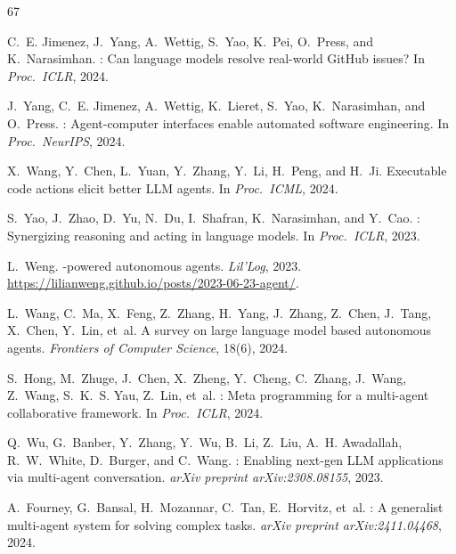 \documentclass[11pt,a4paper]{article}
\begin{document}
\begin{thebibliography}{67}

C.~E. Jimenez, J.~Yang, A.~Wettig, S.~Yao, K.~Pei, O.~Press, and K.~Narasimhan.
: Can language models resolve real-world {GitHub} issues?
\newblock In \emph{Proc.\ ICLR}, 2024.

J.~Yang, C.~E. Jimenez, A.~Wettig, K.~Lieret, S.~Yao, K.~Narasimhan, and O.~Press.
: Agent-computer interfaces enable automated software engineering.
\newblock In \emph{Proc.\ NeurIPS}, 2024.

X.~Wang, Y.~Chen, L.~Yuan, Y.~Zhang, Y.~Li, H.~Peng, and H.~Ji.
\newblock Executable code actions elicit better {LLM} agents.
\newblock In \emph{Proc.\ ICML}, 2024.

S.~Yao, J.~Zhao, D.~Yu, N.~Du, I.~Shafran, K.~Narasimhan, and Y.~Cao.
: Synergizing reasoning and acting in language models.
\newblock In \emph{Proc.\ ICLR}, 2023.

L.~Weng.
-powered autonomous agents.
\newblock \emph{Lil'Log}, 2023.
\newblock \url{https://lilianweng.github.io/posts/2023-06-23-agent/}.

L.~Wang, C.~Ma, X.~Feng, Z.~Zhang, H.~Yang, J.~Zhang, Z.~Chen, J.~Tang, X.~Chen, Y.~Lin, et~al.
\newblock A survey on large language model based autonomous agents.
\newblock \emph{Frontiers of Computer Science}, 18(6), 2024.

S.~Hong, M.~Zhuge, J.~Chen, X.~Zheng, Y.~Cheng, C.~Zhang, J.~Wang, Z.~Wang, S.~K.~S. Yau, Z.~Lin, et~al.
: Meta programming for a multi-agent collaborative framework.
\newblock In \emph{Proc.\ ICLR}, 2024.

Q.~Wu, G.~Banber, Y.~Zhang, Y.~Wu, B.~Li, Z.~Liu, A.~H. Awadallah, R.~W.~White, D.~Burger, and C.~Wang.
: Enabling next-gen {LLM} applications via multi-agent conversation.
\newblock \emph{arXiv preprint arXiv:2308.08155}, 2023.

A.~Fourney, G.~Bansal, H.~Mozannar, C.~Tan, E.~Horvitz, et~al.
: A generalist multi-agent system for solving complex tasks.
\newblock \emph{arXiv preprint arXiv:2411.04468}, 2024.


\end{thebibliography}
\end{document}
